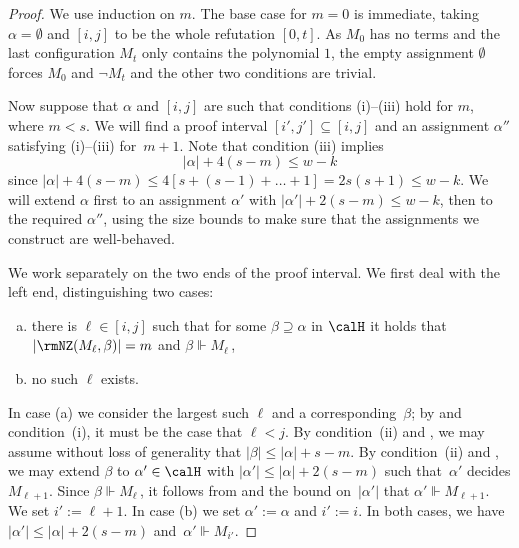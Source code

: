 \begin{proof}
We use induction on $m$.
The base case for $m=0$ is immediate, taking $\alpha= \emptyset$
and $[i,j]$ to be the whole refutation $[0,t]$. 
As $M_0$ has no terms and the last configuration $M_t$ only contains the polynomial $1$, the empty assignment
$\emptyset$ forces $M_0$ and $\neg M_t$
and the other two conditions are trivial.

Now suppose that $\alpha$  and $[i,j]$ are such that conditions  (i)--(iii) 
hold for $m$, where $m < s$. 
We will find a proof interval $[i',j'] \subseteq [i,j]$ 
and an assignment $\alpha''$ satisfying (i)--(iii) for~$m+1$. 
Note that condition (iii) implies 
\begin{equation*}\label{eq:bound1}
|\alpha| + 4(s-m)  \le w-k
\end{equation*}
since
$|\alpha| + 4(s-m)  \le 
4[ s + (s-1) + \dots + 1] 
= 2s(s+1) \le w-k$.
We will extend $\alpha$ first to 
an assignment $\alpha'$ with $|\alpha'| + 2(s-m) \le w-k$, then to the required $\alpha''$,
using the size bounds to make sure that the assignments we construct are well-behaved.

We work separately on the two ends of the proof interval.
We first deal with the left end, distinguishing two cases:
\begin{enumerate}[(a)]
\item 
there is $\ell \in [i,j]$ such that for some $\beta \supseteq \alpha$ in $\calH$
it holds that $|\rmNZ(M_\ell, \beta)| = m$ and $\beta \Vdash M_\ell$\,,
\item 
no such $\ell$ exists.
\end{enumerate}
In case (a) we consider the largest such $\ell$ and a corresponding~$\beta$; 
by  and condition~(i), it must be the case that $\ell < j$. 
By condition~(ii) and , we may assume without
loss of generality that $|\beta| \le |\alpha| + s-m$.
By condition~(ii) and , we may extend $\beta$
to $\alpha' \in \calH$ with $|\alpha'| \le |\alpha| + 2(s-m)$ 
such that~$\alpha'$ decides $M_{\ell +1}$.
Since $\beta \Vdash M_{\ell}$\,, 
it follows from  and the bound on~$|\alpha'|$ that 
$\alpha' \Vdash M_{\ell+1}$. We set $i' := \ell +1$.
In case (b) we set $\alpha' :=\alpha$ and  $i' := i$.
In both cases,
we have $|\alpha'| \le |\alpha|+2(s-m)$ and~$\alpha' \Vdash M_{i'}$.


\end{proof}
